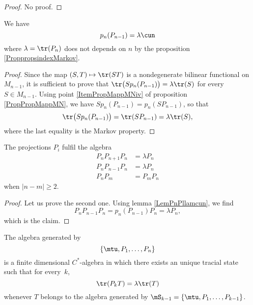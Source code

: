 \begin{proof}
No proof.
\end{proof}

\begin{lemma}		\label{LemPnPllamcun}
We have 
\begin{equation}
	p_n(P_{n-1})=\lambda\cun
\end{equation}
where $\lambda=\tr(P_n)$ does not depends on $n$ by the proposition \ref{ProppropsindexMarkov}.
\end{lemma}

\begin{proof}
Since the map $(S,T)\mapsto\tr(ST)$ is a nondegenerate bilinear functional on $M_{n-1}$, it is sufficient to prove that $\tr\big( Sp_n(P_{n-1}) \big)=\lambda\tr(S)$ for every $S\in M_{n-1}$. Using point \ref{ItemPropMappMNiv} of proposition \ref{PropPropMappMN}, we have $Sp_n(P_{n-1})=p_n(SP_{n-1})$, so that
\begin{equation}
	\tr\big( Sp_n(P_{n-1}) \big)=\tr(SP_{n-1})=\lambda\tr(S),
\end{equation}
where the last equality is the Markov property.
\end{proof}

\begin{proposition}		\label{PropAlgPPPKoi}
	The projections $P_i$ fulfil the algebra
	\begin{subequations}		\label{SubeqPnPalgPPI}
	\begin{align}
		P_nP_{n+1}P_n&=\lambda P_n		\label{EqLoiPPun}		\\
		P_nP_{n-1}P_n&=\lambda P_n		\label{EqLoiPPdeux}		\\
		P_nP_m&=P_mP_n				\label{EqLoiPPtrois}
	\end{align}
	\end{subequations}
	when $| n-m |\geq 2$.
\end{proposition}

\begin{proof}
	Let us prove the second one. Using lemma \ref{LemPnPllamcun}, we find
	\begin{equation}
		P_nP_{n-1}P_n=p_n(P_{n-1})P_n = \lambda P_n,
	\end{equation}
	which is the claim.
\end{proof}

\begin{corollary}
	The algebra generated by
	\begin{equation}
		\{ \mtu,P_1,\ldots, P_n\}
	\end{equation}
	is a finite dimensional $C^*$-algebra in which there exists an unique tracial state such that for every~$k$,
	\begin{equation}
		\tr(P_kT)=\lambda \tr(T)
	\end{equation}
	whenever $T$ belongs to the algebra generated by $\mS_{k-1}=\{ \mtu,P_1,\ldots,P_{k-1} \}$.
\end{corollary}

